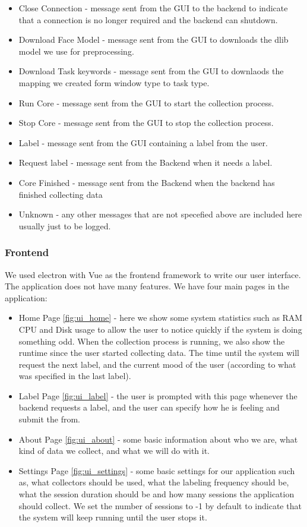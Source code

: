 \documentclass[../main.tex]{subfiles}
\begin{document}
\begin{itemize}
    \item Close Connection - message sent from the GUI to the backend to indicate that a connection is no longer required and the backend can shutdown.
    \item Download Face Model - message sent from the GUI to downloads the dlib model we use for preprocessing.
    \item Download Task keywords - message sent from the GUI to downlaods the mapping we created form window type to task type.
    \item Run Core - message sent from the GUI to start the collection process.
    \item Stop Core - message sent from the GUI to stop the collection process.
    \item Label - message sent from the GUI containing a label from the user.
    \item Request label - message sent from the Backend when it needs a label.
    \item Core Finished - message sent from the Backend when the backend has finished collecting data
    \item Unknown - any other messages that are not specefied above are included here usually just to be logged.
\end{itemize}

\subsubsection{Frontend}

We used electron with Vue as the frontend framework to write our user interface. 
The application does not have many features. We have four main pages in the application:

\begin{itemize}
    \item Home Page \ref{fig:ui_home} - here we show some system statistics such as RAM CPU and Disk usage to allow the user to notice quickly if the system is 
        doing something odd. When the collection process is running, we also show the runtime since the user started collecting data.
        The time until the system will request the next label, and the current mood of the user (according to what was specified in the last label).
    \item Label Page \ref{fig:ui_label} - the user is prompted with this page whenever the backend requests a label, and the user can specify how he is feeling and submit the from.
    \item About Page \ref{fig:ui_about} - some basic information about who we are, what kind of data we collect, and what we will do with it.
    \item Settings Page \ref{fig:ui_settings} - some basic settings for our application such as, what collectors should be used, what the labeling frequency should be, what 
        the session duration should be and how many sessions the application should collect.
        We set the number of sessions to -1 by default to indicate that the system will keep running until the user stops it.

\end{itemize}
\end{document}
